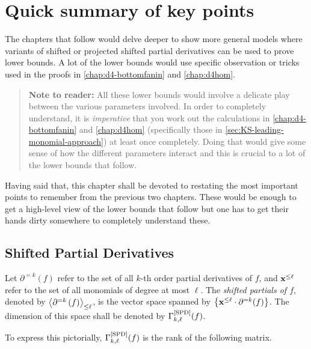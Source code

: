 \chapter{Quick summary of key points}

The chapters that follow would delve deeper to show more general models where variants of shifted or projected shifted partial derivatives can be used to prove lower bounds.
A lot of the lower bounds would use specific observation or tricks used in the proofs in \autoref{chap:d4-bottomfanin} and \autoref{chap:d4hom}. 

\begin{quote}
\begin{mdframed}
{\bf Note to reader:} All these lower bounds would involve a delicate play between the various parameters involved. In order to completely understand, it is \emph{imperative} that you work out the calculations in \autoref{chap:d4-bottomfanin} and \autoref{chap:d4hom} (specifically those in \autoref{sec:KS-leading-monomial-approach}) at least once completely. Doing that would give some sense of how the different parameters interact and this is crucial to a lot of the lower bounds that follow. 
\end{mdframed}
\end{quote}

Having said that, this chapter shall be devoted to restating the most important points to remember from the previous two chapters.
These would be enough to get a high-level view of the lower bounds that follow but one has to get their hands dirty somewhere to completely understand these.

\section{Shifted Partial Derivatives}

\begin{definition*}
  Let $\partial^{=k}(f)$ refer to the set of all $k$-th order partial derivatives of $f$, and $\mathbf{x}^{\leq \ell}$ refer to the set of all monomials of degree at most $\ell$. 
The \emph{shifted partials of $f$}, denoted by $\left\langle\partial^{=k}\left(f\right)\right\rangle_{\leq \ell}$, is the vector space spanned by $\left\{\mathbf{x}^{\leq \ell} \cdot \partial^{=k}(f)\right\}$. 
The dimension of this space shall be denoted by $\Gamma^{\mathrm{[SPD]}}_{k,\ell}(f)$. 
\end{definition*}

\noindent
To express this pictorially, $\Gamma^{\mathrm{[SPD]}}_{k,\ell}(f)$ is the rank of the following matrix. 

